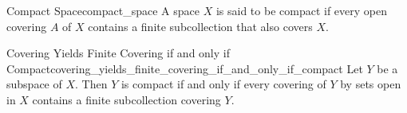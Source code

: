 \begin{definition}{Compact Space}{compact_space}
A space $X$ is said to be compact if every open covering $A$ of $X$ contains a finite subcollection that also covers $X$.
\end{definition}

\begin{lemma}{Covering Yields Finite Covering if and only if Compact}{covering_yields_finite_covering_if_and_only_if_compact}
Let $Y$ be a subspace of $X$. Then $Y$ is compact if and only if every covering of $Y$ by sets open in $X$ contains a finite subcollection covering $Y$.
\end{lemma}

